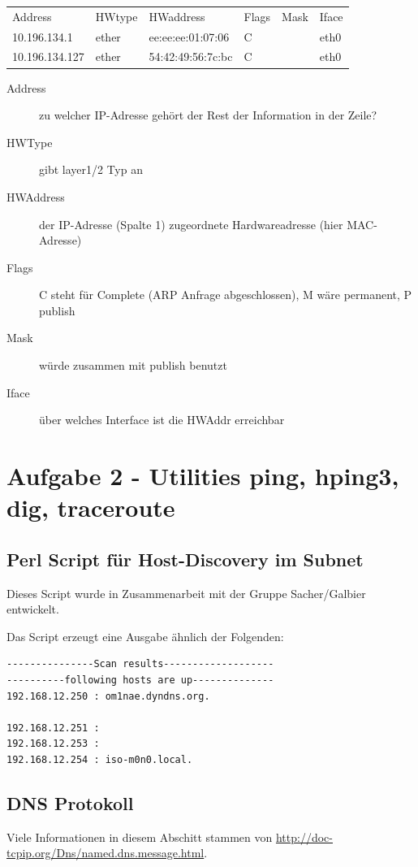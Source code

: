 \documentclass[a4paper,11pt]{scrartcl}
\begin{document}
\begin{tabular}{l|l|l|l|l|l}
	Address & HWtype & HWaddress & Flags & Mask & Iface \\
	10.196.134.1	&	ether	&	ee:ee:ee:01:07:06	&	C	&	&	eth0 \\
	10.196.134.127	&	ether   &	54:42:49:56:7c:bc	&	C	&	&	eth0
\end{tabular}
\begin{description}
	\item[Address] zu welcher IP-Adresse gehört der Rest der Information in der Zeile?
	\item[HWType] gibt layer1/2 Typ an
	\item[HWAddress] der IP-Adresse (Spalte 1) zugeordnete Hardwareadresse (hier MAC-Adresse)
	\item[Flags] C steht für Complete (ARP Anfrage abgeschlossen), M wäre permanent, P publish
	\item[Mask] würde zusammen mit publish benutzt
	\item[Iface] über welches Interface ist die HWAddr erreichbar
\end{description}


\FloatBarrier
\newpage
\section{Aufgabe 2 - Utilities ping, hping3, dig, traceroute}
\subsection{Perl Script für Host-Discovery im Subnet}
Dieses Script wurde in Zusammenarbeit mit der Gruppe Sacher/Galbier entwickelt.


Das Script erzeugt eine Ausgabe ähnlich der Folgenden:
\begin{lstlisting}
---------------Scan results-------------------
----------following hosts are up--------------
192.168.12.250 : om1nae.dyndns.org.

192.168.12.251 : 
192.168.12.253 : 
192.168.12.254 : iso-m0n0.local.
\end{lstlisting}

\FloatBarrier
\subsection{DNS Protokoll}
Viele Informationen in diesem Abschitt stammen von \url{http://doc-tcpip.org/Dns/named.dns.message.html}.
\end{document}
